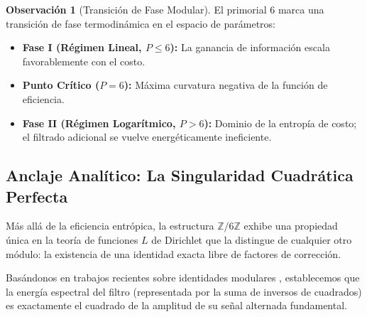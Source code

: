 \documentclass[12pt, a4paper]{article}
\theoremstyle{plain}
\theoremstyle{definition}
\newtheorem{observacion}[teorema]{Observación}
\newcommand{\Z}{\mathbb{Z}}
\begin{document}
\begin{observacion}[Transición de Fase Modular]
El primorial 6 marca una transición de fase termodinámica en el espacio de parámetros:
\begin{itemize}
    \item \textbf{Fase I (Régimen Lineal, $P \le 6$):} La ganancia de información escala favorablemente con el costo.
    \item \textbf{Punto Crítico ($P=6$):} Máxima curvatura negativa de la función de eficiencia.
    \item \textbf{Fase II (Régimen Logarítmico, $P > 6$):} Dominio de la entropía de costo; el filtrado adicional se vuelve energéticamente ineficiente.
\end{itemize}
\end{observacion}

\subsection{Anclaje Analítico: La Singularidad Cuadrática Perfecta}

Más allá de la eficiencia entrópica, la estructura $\Z/6\Z$ exhibe una propiedad única en la teoría de funciones $L$ de Dirichlet que la distingue de cualquier otro módulo: la existencia de una identidad exacta libre de factores de corrección.

Basándonos en trabajos recientes sobre identidades modulares \cite{Peinador2024c}, establecemos que la energía espectral del filtro (representada por la suma de inversos de cuadrados) es exactamente el cuadrado de la amplitud de su señal alternada fundamental.
\end{document}

